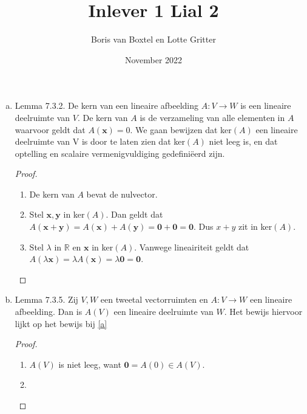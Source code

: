 \documentclass[12pt, a4paper]{article}
\title{Inlever 1 Lial 2}
\author{Boris van Boxtel en Lotte Gritter}
\date{November 2022}
\begin{document}
\maketitle 

\begin{enumerate}[(a).]
    \item \label{a}
        Lemma 7.3.2. De kern van een lineaire afbeelding $A: V \rightarrow W$ is een lineaire deelruimte van $V$. \newline 
        De kern van $A$ is de verzameling van alle elementen in $A$ waarvoor geldt dat $A(\mathbf{x})=0$. We gaan bewijzen dat ker$(A)$ een lineaire deelruimte van V is door te laten zien dat ker$(A)$ niet leeg is, en dat optelling en scalaire vermenigvuldiging gedefiniëerd zijn.

        \begin{proof}\leavevmode
            \begin{enumerate}[1.]
                \item De kern van $A$ bevat de nulvector. 
                
                \item Stel $\mathbf{x},\mathbf{y}$ in ker$(A)$. Dan geldt dat $A(\mathbf{x}+\mathbf{y})=A(\mathbf{x})+A(\mathbf{y})= \mathbf{0} + \mathbf{0}=\mathbf{0}$. Dus $x+y$ zit in ker$(A)$. 
                
                \item Stel $\lambda$ in $\mathbb{R}$ en $\mathbf{x}$ in ker$(A)$. Vanwege lineairiteit geldt dat $A(\lambda \mathbf{x})=\lambda A(\mathbf{x}) = \lambda \mathbf{0} = \mathbf{0}$.
            \end{enumerate}
        \end{proof}

    \item \label{b}
        Lemma 7.3.5. Zij $V, W$ een tweetal vectorruimten en $A: V \rightarrow W$ een lineaire afbeelding. Dan is $A(V)$ een lineaire deelruimte van $W$.
        \newline Het bewijs hiervoor lijkt op het bewijs bij \ref{a}

        \begin{proof}\leavevmode
            \begin{enumerate}[1.]
            \item $A(V)$ is niet leeg, want $\mathbf{0}=A(0) \in A(V)$.
            
            \item
            \end{enumerate} 
        \end{proof}


\end{enumerate}
\end{document}

